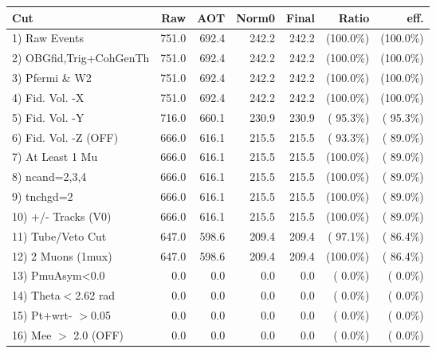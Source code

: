  \begin{table}[h!]\centering
 \begin{tabular}{||l||r|r|r|r|r|r||}
 \hline
 \hline
 Cut & Raw & AOT & Norm0 & Final & Ratio & eff.       \\
 \hline
  1) Raw Events           &        751.0 &        692.4 &        242.2 &        242.2 & (100.0\%) & (100.0\%) \\
  2) OBGfid,Trig+CohGenTh &        751.0 &        692.4 &        242.2 &        242.2 & (100.0\%) & (100.0\%) \\
  3) Pfermi \& W2         &        751.0 &        692.4 &        242.2 &        242.2 & (100.0\%) & (100.0\%) \\
  4) Fid. Vol. -X         &        751.0 &        692.4 &        242.2 &        242.2 & (100.0\%) & (100.0\%) \\
  5) Fid. Vol. -Y         &        716.0 &        660.1 &        230.9 &        230.9 & ( 95.3\%) & ( 95.3\%) \\
  6) Fid. Vol. -Z (OFF)   &        666.0 &        616.1 &        215.5 &        215.5 & ( 93.3\%) & ( 89.0\%) \\
  7) At Least 1 Mu        &        666.0 &        616.1 &        215.5 &        215.5 & (100.0\%) & ( 89.0\%) \\
  8) ncand=2,3,4          &        666.0 &        616.1 &        215.5 &        215.5 & (100.0\%) & ( 89.0\%) \\
  9) tnchgd=2             &        666.0 &        616.1 &        215.5 &        215.5 & (100.0\%) & ( 89.0\%) \\
 10) +/- Tracks (V0)      &        666.0 &        616.1 &        215.5 &        215.5 & (100.0\%) & ( 89.0\%) \\
 11) Tube/Veto Cut        &        647.0 &        598.6 &        209.4 &        209.4 & ( 97.1\%) & ( 86.4\%) \\
 12) 2 Muons (1mux)       &        647.0 &        598.6 &        209.4 &        209.4 & (100.0\%) & ( 86.4\%) \\
 13) PmuAsym<0.0          &          0.0 &          0.0 &          0.0 &          0.0 & (  0.0\%) & (  0.0\%) \\
 14) Theta$<$2.62 rad     &          0.0 &          0.0 &          0.0 &          0.0 & (  0.0\%) & (  0.0\%) \\
 15) Pt+wrt- $>$0.05      &          0.0 &          0.0 &          0.0 &          0.0 & (  0.0\%) & (  0.0\%) \\
 16) Mee $>$ 2.0  (OFF)   &          0.0 &          0.0 &          0.0 &          0.0 & (  0.0\%) & (  0.0\%) \\

\end{tabular}
\end{table}
